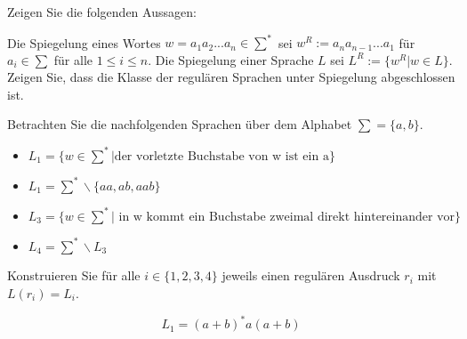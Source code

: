 \documentclass[10pt, a4paper]{exam}
\begin{document}
\begin{questions}
    \question Zeigen Sie die folgenden Aussagen:

    \question Die Spiegelung eines Wortes $w=a_1a_2...a_n\in\sum^*$ sei $w^R := a_na_{n-1}...a_1$ für $a_i\in\sum$ für alle $1\leq i \leq n$. Die Spiegelung einer Sprache $L$ sei $L^R := \{w^R \vert w\in L\}$. Zeigen Sie, dass die Klasse der regulären Sprachen unter Spiegelung abgeschlossen ist.
    \begin{solution}
    \end{solution}

    \question Betrachten Sie die nachfolgenden Sprachen über dem Alphabet $\sum = \{a, b\}$.
    \begin{itemize}
        \item $L_1 = \{w\in\sum^*\vert\text{der vorletzte Buchstabe von w ist ein a}\}$
        \item $L_1 = \sum^*\backslash \{ aa, ab, aab\}$
        \item $L_3 = \{w\in\sum^*\vert\text{ in w kommt ein Buchstabe zweimal direkt hintereinander vor}\}$
        \item $L_4 = \sum^*\backslash L_3$
    \end{itemize}
    Konstruieren Sie für alle $i\in\{1, 2, 3, 4\}$ jeweils einen regulären Ausdruck $r_i$ mit $L(r_i) = L_i$.

    \begin{solution}
        $$L_1 = (a+b)^* a (a+b)$$


\end{solution}
\end{questions}
\end{document}
